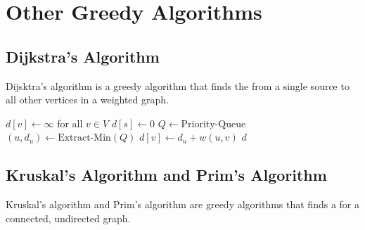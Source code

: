 \section{Other Greedy Algorithms}

\subsection{Dijkstra's Algorithm}\label{subsec:dijkstras-algorithm}

Dijsktra's algorithm is a greedy algorithm that finds the  from a single source to all other vertices in a weighted graph. 

\begin{algorithm}[ht!]
    \begin{algorithmic}[1]
            \State $d[v] \gets \infty$ for all $v \in V$
            \State $d[s] \gets 0$
            \State $Q \gets \text{Priority-Queue}$
            \State {}
                \State $(u, d_u) \gets \text{Extract-Min}(Q)$
                        \State $d[v] \gets d_u + w(u, v)$
                        \State {}
                    \EndIf
                \EndFor
            \EndWhile
            \State \Return $d$
        \EndFunction
    \end{algorithmic}
\end{algorithm}

\subsection{Kruskal's Algorithm and Prim's Algorithm}

Kruskal's algorithm and Prim's algorithm are greedy algorithms that finds a  for a connected, undirected graph. 

